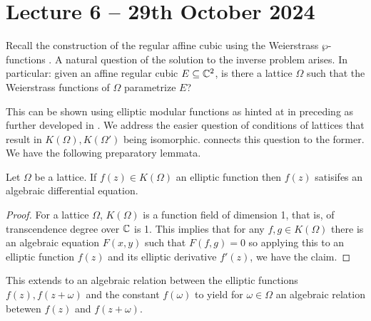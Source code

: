 \section{Lecture 6 -- 29th October 2024}\label{sec: lecture 6}
Recall the construction of the regular affine cubic using the Weierstrass $\wp$-functions . A natural question of the solution to the inverse problem arises. In particular: given an affine regular cubic $E\subseteq\mathbb{C}^{2}$, is there a lattice $\Omega$ such that the Weierstrass functions of $\Omega$ parametrize $E$? 

This can be shown using elliptic modular functions as hinted at in  preceding  as further developed in \cite{Ahlfors}. We address the easier question of conditions of lattices that result in $K(\Omega),K(\Omega')$ being isomorphic.  connects this question to the former. We have the following preparatory lemmata. 
\begin{lemma}\label{lem: elliptic functions satisfy algebraic differential equation}
    Let $\Omega$ be a lattice. If $f(z)\in K(\Omega)$ an elliptic function then $f(z)$ satisifes an algebraic differential equation. 
\end{lemma}
\begin{proof}
    For a lattice $\Omega$, $K(\Omega)$ is a function field of dimension 1, that is, of transcendence degree over $\mathbb{C}$ is 1. This implies that for any $f,g\in K(\Omega)$ there is an algebraic equation $F(x,y)$ such that $F(f,g)=0$ so applying this to an elliptic function $f(z)$ and its elliptic derivative $f'(z)$, we have the claim. 
\end{proof}
This extends to an algebraic relation between the elliptic functions $f(z),f(z+\omega)$ and the constant $f(\omega)$ to yield for $\omega\in\Omega$ an algebraic relation betewen $f(z)$ and $f(z+\omega)$. 


